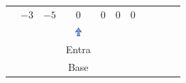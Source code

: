 \begin{frame}
{\begin{table}
\begin{tabular}{c c c c c c c c c c c}
				& \cellcolor{yellow!50} $\scriptstyle -3$
				& \cellcolor{gray!50} $\scriptstyle -5$
				& \cellcolor{yellow!50} $\scriptstyle 0$
				& \cellcolor{yellow!50} $\scriptstyle 0$
				& \cellcolor{yellow!50} $\scriptstyle 0$
				& \cellcolor{gray!50} $\scriptstyle 0$ 
				&
				&
				& \\
				\cline{1-8} 
				& 
				& 
				& \includegraphics[width=0.3cm,height=0.3cm]{setacima.jpg}
				& 
				& 
				& 
				&  
				&
				&
				& \\ 
				& 
				& 
				& \scriptsize \color{red} Entra 
				& 
				& 
				& 
				&  
				&
				&
				& \\
				& 
				& 
				& \scriptsize \color{red} Base 
				& 
				& 
				& 
				&  
				&
				&
				& \\


\end{tabular}
\end{table}}
\end{frame}
